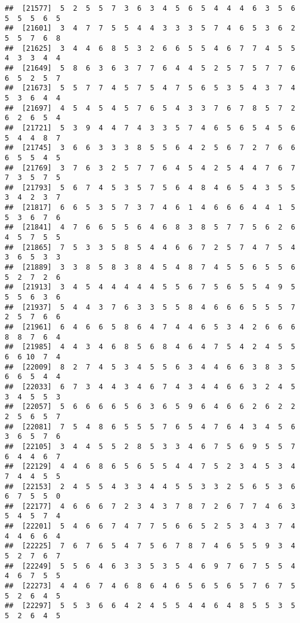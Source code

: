 \documentclass[
]{book}
\begin{document}
\begin{verbatim}
##  [21577]  5  2  5  5  7  3  6  3  4  5  6  5  4  4  4  6  3  5  6  5  5  5  6  5
##  [21601]  3  4  7  7  5  5  4  4  3  3  3  5  7  4  6  5  3  6  2  5  5  7  6  8
##  [21625]  3  4  4  6  8  5  3  2  6  6  5  5  4  6  7  7  4  5  5  4  3  3  4  4
##  [21649]  5  8  6  3  6  3  7  7  6  4  4  5  2  5  7  5  7  7  6  6  5  2  5  7
##  [21673]  5  5  7  7  4  5  7  5  4  7  5  6  5  3  5  4  3  7  4  5  3  6  4  4
##  [21697]  4  5  4  5  4  5  7  6  5  4  3  3  7  6  7  8  5  7  2  6  2  6  5  4
##  [21721]  5  3  9  4  4  7  4  3  3  5  7  4  6  5  6  5  4  5  6  5  4  4  8  7
##  [21745]  3  6  6  3  3  3  8  5  5  6  4  2  5  6  7  2  7  6  6  6  5  5  4  5
##  [21769]  3  7  6  3  2  5  7  7  6  4  5  4  2  5  4  4  7  6  7  7  3  5  7  5
##  [21793]  5  6  7  4  5  3  5  7  5  6  4  8  4  6  5  4  3  5  5  3  4  2  3  7
##  [21817]  6  6  5  3  5  7  3  7  4  6  1  4  6  6  6  4  4  1  5  5  3  6  7  6
##  [21841]  4  7  6  6  5  5  6  4  6  8  3  8  5  7  7  5  6  2  6  4  5  7  5  5
##  [21865]  7  5  3  3  5  8  5  4  4  6  6  7  2  5  7  4  7  5  4  3  6  5  3  3
##  [21889]  3  3  8  5  8  3  8  4  5  4  8  7  4  5  5  6  5  5  6  5  2  7  2  6
##  [21913]  3  4  5  4  4  4  4  4  5  5  6  7  5  6  5  5  4  9  5  5  5  6  3  6
##  [21937]  5  4  4  3  7  6  3  3  5  5  8  4  6  6  6  5  5  5  7  2  5  7  6  6
##  [21961]  6  4  6  6  5  8  6  4  7  4  4  6  5  3  4  2  6  6  6  8  8  7  6  4
##  [21985]  4  4  3  4  6  8  5  6  8  4  6  4  7  5  4  2  4  5  5  6  6 10  7  4
##  [22009]  8  2  7  4  5  3  4  5  5  6  3  4  4  6  6  3  8  3  5  6  6  5  4  4
##  [22033]  6  7  3  4  4  3  4  6  7  4  3  4  4  6  6  3  2  4  5  3  4  5  5  3
##  [22057]  5  6  6  6  6  5  6  3  6  5  9  6  4  6  6  2  6  2  2  2  5  6  5  7
##  [22081]  7  5  4  8  6  5  5  5  7  6  5  4  7  6  4  3  4  5  6  3  6  5  7  6
##  [22105]  3  4  4  5  5  2  8  5  3  3  4  6  7  5  6  9  5  5  7  6  4  4  6  7
##  [22129]  4  4  6  8  6  5  6  5  5  4  4  7  5  2  3  4  5  3  4  7  4  4  5  5
##  [22153]  2  4  5  5  4  3  3  4  4  5  5  3  3  2  5  6  5  3  6  6  7  5  5  0
##  [22177]  4  6  6  6  7  2  3  4  3  7  8  7  2  6  7  7  4  6  3  5  4  5  7  4
##  [22201]  5  4  6  6  7  4  7  7  5  6  6  5  2  5  3  4  3  7  4  4  4  6  6  4
##  [22225]  7  6  7  6  5  4  7  5  6  7  8  7  4  6  5  5  9  3  4  5  2  7  6  7
##  [22249]  5  5  6  4  6  3  3  5  3  5  4  6  9  7  6  7  5  5  4  4  6  7  5  5
##  [22273]  4  4  6  7  4  6  8  6  4  6  5  6  5  6  5  7  6  7  5  5  2  6  4  5
##  [22297]  5  5  3  6  6  4  2  4  5  5  4  4  6  4  8  5  5  3  5  5  2  6  4  5

\end{verbatim}
\end{document}
